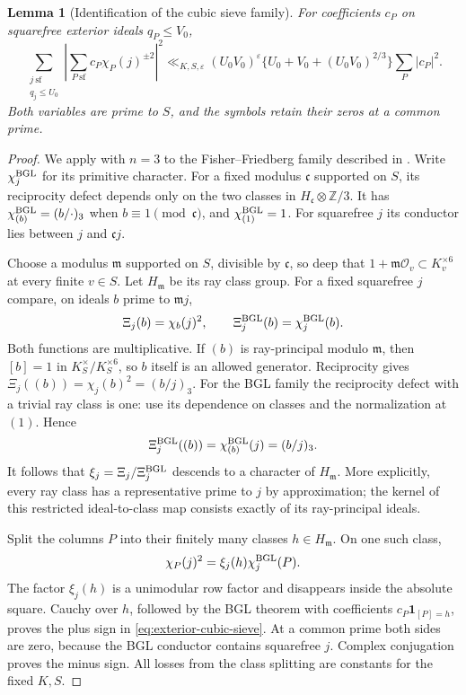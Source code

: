 \documentclass[11pt,a4paper]{article}
\numberwithin{equation}{section}
\newtheorem{lemma}[theorem]{Lemma}
\theoremstyle{definition}
\theoremstyle{remark}
\newcommand{\eps}{\varepsilon}
\newcommand{\ZZ}{\mathbb Z}
\newcommand{\ind}{\mathbf 1}
\begin{document}
\begin{lemma}[Identification of the cubic sieve family]\label{lem:exterior-cubic-sieve}
For coefficients $c_P$ on squarefree exterior ideals $q_P\le V_0$,
\begin{equation}\label{eq:exterior-cubic-sieve}
 \sum_{\substack{j\ \mathrm{sf}\\q_j\le U_0}}
       \left|\sum_{P\ \mathrm{sf}}c_P\chi_P(j)^{\pm2}\right|^2
 \ll_{K,S,\eps}(U_0V_0)^\eps
       \{U_0+V_0+(U_0V_0)^{2/3}\}\sum_P|c_P|^2.
\end{equation}
Both variables are prime to $S$, and the symbols retain their zeros
at a common prime.
\end{lemma}
\begin{proof}
We apply \cite[Theorem 1.3]{BGL} with $n=3$ to the Fisher--Friedberg
family described in \cite[Section~2, Lemma~2.1 and Appendix~II]{BGL}.
Write $\chi_j^{\rm BGL}$ for its primitive character.  For a fixed modulus $\mathfrak c$ supported on $S$, its
reciprocity defect depends only on the two classes in
$H_{\mathfrak c}\otimes\ZZ/3$.  It has
$\chi_{(b)}^{\rm BGL}=(b/\cdot)_3$ when $b\equiv1\pmod{\mathfrak c}$,
and $\chi_{(1)}^{\rm BGL}=1$.  For squarefree $j$ its conductor lies
between $j$ and $\mathfrak c j$.  

Choose a modulus $\mathfrak m$ supported on $S$, divisible by
$\mathfrak c$, so deep that
$1+\mathfrak m\mathcal O_v\subset K_v^{\times6}$ at every finite
$v\in S$.  Let $H_{\mathfrak m}$ be its ray class group.  For a fixed
squarefree $j$ compare, on ideals $b$ prime to $\mathfrak m j$,
\[
 \Xi_j(b)=\chi_b(j)^2,
       \qquad\Xi_j^{\rm BGL}(b)=\chi_j^{\rm BGL}(b).
\]
Both functions are multiplicative.  If $(b)$ is ray-principal modulo
$\mathfrak m$, then $[b]=1$ in $K_S^\times/K_S^{\times6}$, so $b$
itself is an allowed generator.  Reciprocity gives
$\Xi_j((b))=\chi_j(b)^2=(b/j)_3$.
For the BGL family the reciprocity defect with a trivial ray class is
one: use its dependence on classes and the normalization at $(1)$.
Hence
\[
 \Xi_j^{\rm BGL}((b))
       =\chi_{(b)}^{\rm BGL}(j)=(b/j)_3.
\]
It follows that $\xi_j=\Xi_j/\Xi_j^{\rm BGL}$ descends to a
character of $H_{\mathfrak m}$.  More explicitly, every ray class has
a representative prime to $j$ by approximation; the kernel of this
restricted ideal-to-class map consists exactly of its ray-principal
ideals.  

Split the columns $P$ into their finitely many classes
$h\in H_{\mathfrak m}$.  On one such class,
\[
 \chi_P(j)^2=\xi_j(h)\chi_j^{\rm BGL}(P).
\]
The factor $\xi_j(h)$ is a unimodular row factor and disappears inside
the absolute square.  Cauchy over $h$, followed by the BGL theorem
with coefficients $c_P\ind_{[P]=h}$, proves the plus sign in
\eqref{eq:exterior-cubic-sieve}.  At a common prime both sides are
zero, because the BGL conductor contains squarefree $j$.
Complex conjugation proves the minus sign.  All losses from the
class splitting are constants for the fixed $K,S$.
\end{proof}
\end{document}
